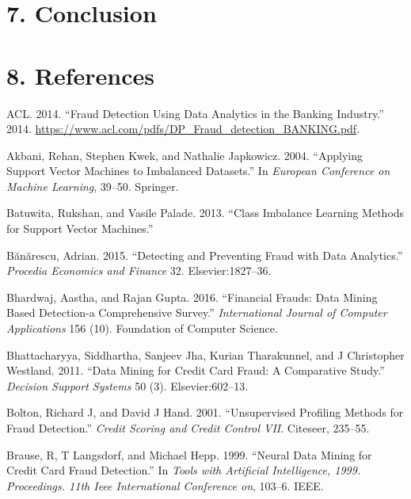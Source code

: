 \documentclass[12pt,]{article}
\begin{document}
\hypertarget{conclusion}{%
\section{7. Conclusion}\label{conclusion}}

\hypertarget{references}{%
\section*{8. References}\label{references}}

\hypertarget{refs}{}
\leavevmode\hypertarget{ref-fraudanalyticsacl}{}%
ACL. 2014. ``Fraud Detection Using Data Analytics in the Banking
Industry.'' 2014.
\url{https://www.acl.com/pdfs/DP_Fraud_detection_BANKING.pdf}.

\leavevmode\hypertarget{ref-akbani2004applying}{}%
Akbani, Rehan, Stephen Kwek, and Nathalie Japkowicz. 2004. ``Applying
Support Vector Machines to Imbalanced Datasets.'' In \emph{European
Conference on Machine Learning}, 39--50. Springer.

\leavevmode\hypertarget{ref-batuwita2013class}{}%
Batuwita, Rukshan, and Vasile Palade. 2013. ``Class Imbalance Learning
Methods for Support Vector Machines.''

\leavevmode\hypertarget{ref-buanuarescu2015detecting}{}%
Bănărescu, Adrian. 2015. ``Detecting and Preventing Fraud with Data
Analytics.'' \emph{Procedia Economics and Finance} 32.
Elsevier:1827--36.

\leavevmode\hypertarget{ref-bhardwaj2016financial}{}%
Bhardwaj, Aastha, and Rajan Gupta. 2016. ``Financial Frauds: Data Mining
Based Detection-a Comprehensive Survey.'' \emph{International Journal of
Computer Applications} 156 (10). Foundation of Computer Science.

\leavevmode\hypertarget{ref-bhattacharyya2011data}{}%
Bhattacharyya, Siddhartha, Sanjeev Jha, Kurian Tharakunnel, and J
Christopher Westland. 2011. ``Data Mining for Credit Card Fraud: A
Comparative Study.'' \emph{Decision Support Systems} 50 (3).
Elsevier:602--13.

\leavevmode\hypertarget{ref-bolton2001unsupervised}{}%
Bolton, Richard J, and David J Hand. 2001. ``Unsupervised Profiling
Methods for Fraud Detection.'' \emph{Credit Scoring and Credit Control
VII}. Citeseer, 235--55.

\leavevmode\hypertarget{ref-brause1999neural}{}%
Brause, R, T Langsdorf, and Michael Hepp. 1999. ``Neural Data Mining for
Credit Card Fraud Detection.'' In \emph{Tools with Artificial
Intelligence, 1999. Proceedings. 11th Ieee International Conference on},
103--6. IEEE.
\end{document}
